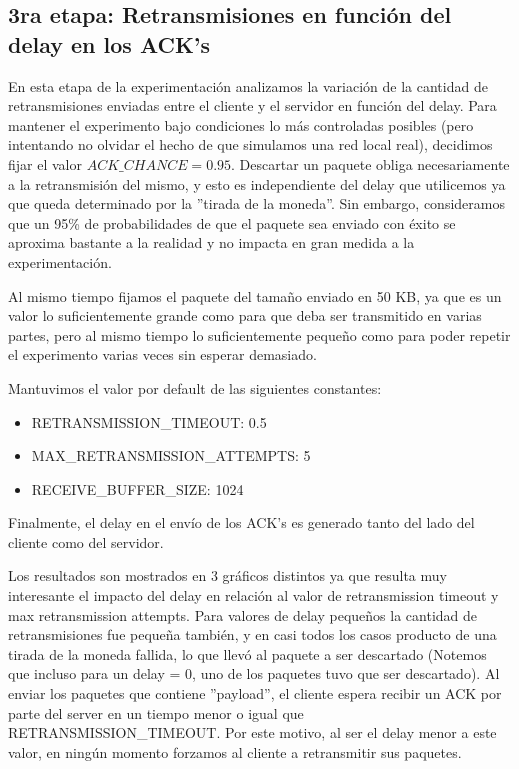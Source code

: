 \subsection{3ra etapa: Retransmisiones en función del delay en los ACK's}

En esta etapa de la experimentación analizamos la variación de la cantidad de retransmisiones enviadas entre el cliente
y el servidor en función del delay.
Para mantener el experimento bajo condiciones lo más controladas posibles (pero intentando no olvidar el hecho de que
simulamos una red local real), decidimos fijar el valor $ACK\_CHANCE=0.95$. Descartar un paquete obliga necesariamente 
a la retransmisión del mismo, y esto es independiente del delay que utilicemos ya que queda determinado por la
''tirada de la moneda''. Sin embargo, consideramos que un 95\% de probabilidades de que el paquete sea enviado con éxito se aproxima bastante a la realidad y no impacta en gran medida a la experimentación.

Al mismo tiempo fijamos el paquete del tama\~no enviado en 50 KB, ya que es un valor lo suficientemente grande como 
para que deba ser transmitido en varias partes, pero al mismo tiempo lo suficientemente peque\~no como para poder
repetir el experimento varias veces sin esperar demasiado.

Mantuvimos el valor por default de las siguientes constantes: 
\begin{itemize}
\item{RETRANSMISSION\_TIMEOUT: 0.5 }
\item{MAX\_RETRANSMISSION\_ATTEMPTS: 5 }
\item{RECEIVE\_BUFFER\_SIZE: 1024}
\end{itemize}

Finalmente, el delay en el envío de los ACK's es generado tanto del lado del cliente como del servidor.

Los resultados son mostrados en 3 gráficos distintos ya que resulta muy interesante el impacto del delay en relación al
valor de retransmission timeout y max retransmission attempts.
Para valores de delay peque\~nos la cantidad de retransmisiones fue peque\~na también, y en casi todos los casos
producto de una tirada de la moneda fallida, lo que llevó al paquete a ser descartado (Notemos que 
incluso para un delay = 0,
uno de los paquetes tuvo que ser descartado). 
Al enviar los paquetes que contiene ''payload'', el cliente espera recibir un ACK
por parte del server en un tiempo menor o igual que RETRANSMISSION\_TIMEOUT. Por este motivo, al ser el delay menor
a este valor, en ningún momento forzamos al cliente a retransmitir sus paquetes.

